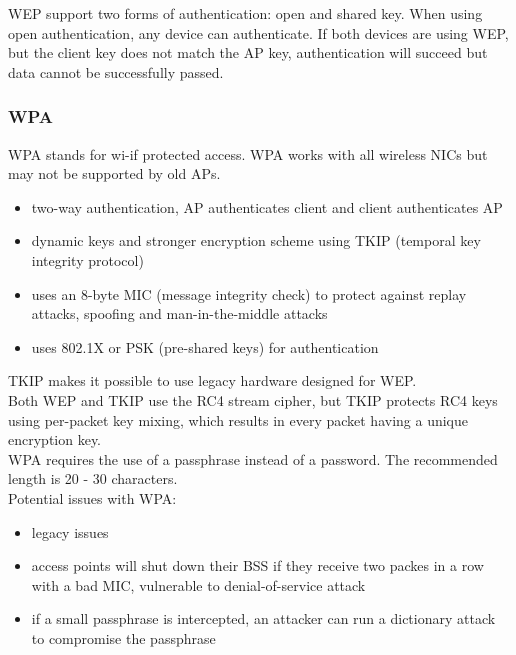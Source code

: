 WEP support two forms of authentication: open and shared key. When using open
authentication, any device can authenticate. If both devices are using WEP,
but the client key does not match the AP key, authentication will succeed but
data cannot be successfully passed.

\subsubsection{WPA}

WPA stands for wi-if protected access. WPA works with all wireless NICs but
may not be supported by old APs.

\begin{itemize}

\item two-way authentication, AP authenticates client and client authenticates
AP
\item dynamic keys and stronger encryption scheme using TKIP (temporal key
integrity protocol)
\item uses an 8-byte MIC (message integrity check) to protect against replay
attacks, spoofing and man-in-the-middle attacks
\item uses 802.1X or PSK (pre-shared keys) for authentication

\end{itemize}

TKIP makes it possible to use legacy hardware designed for WEP.\\

Both WEP and TKIP use the RC4 stream cipher, but TKIP protects RC4 keys using
per-packet key mixing, which results in every packet having a unique encryption
key.\\

WPA requires the use of a passphrase instead of a password. The recommended
length is 20 - 30 characters.\\

Potential issues with WPA:

\begin{itemize}

\item legacy issues
\item access points will shut down their BSS if they receive two packes in a
row with a bad MIC, vulnerable to denial-of-service attack
\item if a small passphrase is intercepted, an attacker can run a dictionary
attack to compromise the passphrase

\end{itemize}

